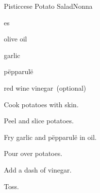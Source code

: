 \begin{recipe}{Pisticcese Potato Salad}{Nonna}{}

\begin{ingredients}
\item {}es
\item olive oil
\item garlic
\item p\"epparul\"e
\item red wine vinegar~(optional)
\end{ingredients}

\begin{directions}
\item Cook potatoes with skin.
\item Peel and slice potatoes.
\item Fry garlic and p\"epparul\"e in oil.
\item Pour over potatoes.
\item Add a dash of vinegar.
\item Toss.
\end{directions}

\end{recipe}
